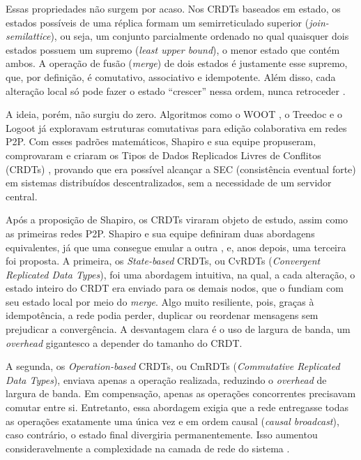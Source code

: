 Essas propriedades não surgem por acaso. Nos CRDTs baseados em estado, os estados possíveis de uma réplica formam um semirreticulado
superior (\textit{join-semilattice}), ou seja, um conjunto parcialmente ordenado no qual quaisquer dois estados possuem um supremo
(\textit{least upper bound}), o menor estado que contém ambos. A operação de fusão (\textit{merge}) de dois estados é justamente esse supremo,
que, por definição, é comutativo, associativo e idempotente. Além disso, cada alteração local só pode fazer o estado ``crescer'' nessa ordem,
nunca retroceder \cite{shapiro2011}.

A ideia, porém, não surgiu do zero. Algoritmos como o WOOT \cite{oster2006}, o Treedoc \cite{preguica2009} e o Logoot \cite{weiss2009}
já exploravam estruturas comutativas para edição colaborativa em redes P2P. Com esses padrões matemáticos, Shapiro e sua equipe propuseram, comprovaram e criaram os Tipos de Dados Replicados Livres de Conflitos (CRDTs) \cite{shapiro2011},
provando que era possível alcançar a SEC (consistência eventual forte) em sistemas distribuídos descentralizados, sem a necessidade de um servidor central.

Após a proposição de Shapiro, os CRDTs viraram objeto de estudo, assim como as primeiras redes P2P. Shapiro e sua equipe definiram duas abordagens equivalentes, já que uma consegue emular a outra
\cite{shapiro2011}, e, anos depois, uma terceira foi proposta. A primeira, os \textit{State-based} CRDTs, ou CvRDTs (\textit{Convergent Replicated
Data Types}), foi uma abordagem intuitiva, na qual, a cada alteração, o estado inteiro do CRDT era enviado para os demais nodos, que o fundiam
com seu estado local por meio do \textit{merge}. Algo muito resiliente, pois, graças à idempotência, a rede podia perder, duplicar ou reordenar
mensagens sem prejudicar a convergência. A desvantagem clara é o uso de largura de banda, um \textit{overhead} gigantesco a depender do tamanho do CRDT.

A segunda, os \textit{Operation-based} CRDTs, ou CmRDTs (\textit{Commutative Replicated Data Types}), enviava apenas a operação realizada,
reduzindo o \textit{overhead} de largura de banda. Em compensação, apenas as operações concorrentes precisavam comutar entre si. Entretanto, essa
abordagem exigia que a rede entregasse todas as operações exatamente uma única vez e em ordem causal (\textit{causal broadcast}), caso contrário,
o estado final divergiria permanentemente. Isso aumentou consideravelmente
a complexidade na camada de rede do sistema \cite{shapiro2011comprehensive}.

